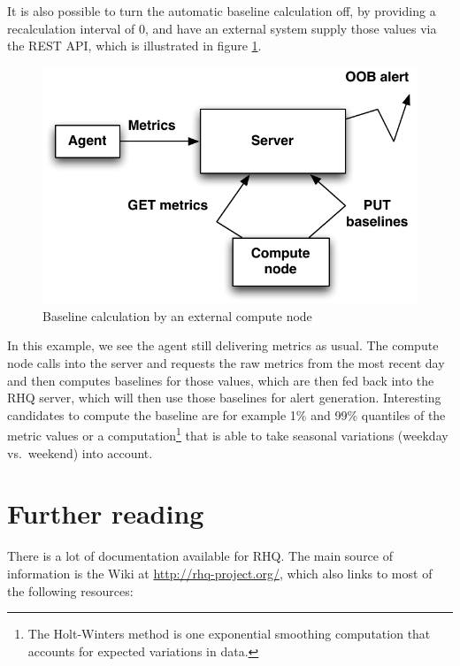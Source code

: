 \documentclass[twocolumn,10pt,a4paper]{article}
\begin{document}
It is also possible to turn the automatic baseline calculation off, by providing a recalculation interval of 0, and have an external system supply those values via the REST API, which is illustrated in figure \ref{fig:comp-node}.

\begin{figure}[h]
\noindent\includegraphics[width=\columnwidth]{graph/ext_baseline.pdf}
\caption{Baseline calculation by an external compute node}
\label{fig:comp-node}
\end{figure}

In this example, we see the agent still delivering metrics as usual. The compute node calls into the server and requests the raw metrics from the most recent day and then computes baselines for those values, which are then fed back into the RHQ server, which will then use those baselines for alert generation. Interesting candidates to compute the baseline are for example 1\% and 99\% quantiles of the metric values or a computation\footnote{The Holt-Winters method is one exponential smoothing computation that accounts for expected variations in data.} that is able to take seasonal variations (weekday vs.\ weekend) into account.

\section{Further reading}

There is a lot of documentation available for RHQ. The main source of information is the Wiki at \url{http://rhq-project.org/}, which also links to most of the following resources:
\end{document}
